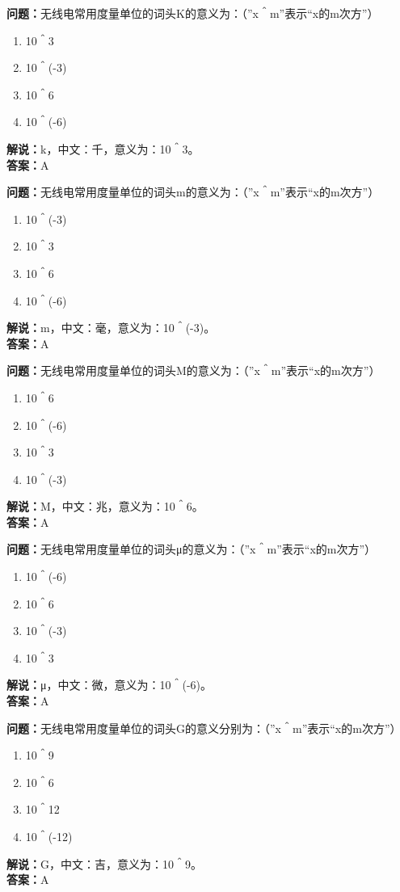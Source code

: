 \documentclass[UTF8]{ctexbook}
\begin{document}
\textbf{问题：}无线电常用度量单位的词头K的意义为：（”x＾m”表示“x的m次方”）
\begin{enumerate}[label=\Alph*), leftmargin=3em]
  \item 10＾3
  \item 10＾(-3)
  \item 10＾6
  \item 10＾(-6)
\end{enumerate}
\textbf{解说：}k，中文：千，意义为：10＾3。\\
\textbf{答案：}A

\textbf{问题：}无线电常用度量单位的词头m的意义为：（”x＾m”表示“x的m次方”）
\begin{enumerate}[label=\Alph*), leftmargin=3em]
  \item 10＾(-3)
  \item 10＾3
  \item 10＾6
  \item 10＾(-6)
\end{enumerate}
\textbf{解说：}m，中文：毫，意义为：10＾(-3)。\\
\textbf{答案：}A

\textbf{问题：}无线电常用度量单位的词头M的意义为：（”x＾m”表示“x的m次方”）
\begin{enumerate}[label=\Alph*), leftmargin=3em]
  \item 10＾6
  \item 10＾(-6)
  \item 10＾3
  \item 10＾(-3)
\end{enumerate}
\textbf{解说：}M，中文：兆，意义为：10＾6。\\
\textbf{答案：}A

\textbf{问题：}无线电常用度量单位的词头μ的意义为：（”x＾m”表示“x的m次方”）
\begin{enumerate}[label=\Alph*), leftmargin=3em]
  \item 10＾(-6)
  \item 10＾6
  \item 10＾(-3)
  \item 10＾3
\end{enumerate}
\textbf{解说：}μ，中文：微，意义为：10＾(-6)。\\
\textbf{答案：}A

\textbf{问题：}无线电常用度量单位的词头G的意义分别为：（”x＾m”表示“x的m次方”）
\begin{enumerate}[label=\Alph*), leftmargin=3em]
  \item 10＾9
  \item 10＾6
  \item 10＾12
  \item 10＾(-12)
\end{enumerate}
\textbf{解说：}G，中文：吉，意义为：10＾9。\\
\textbf{答案：}A
\end{document}
